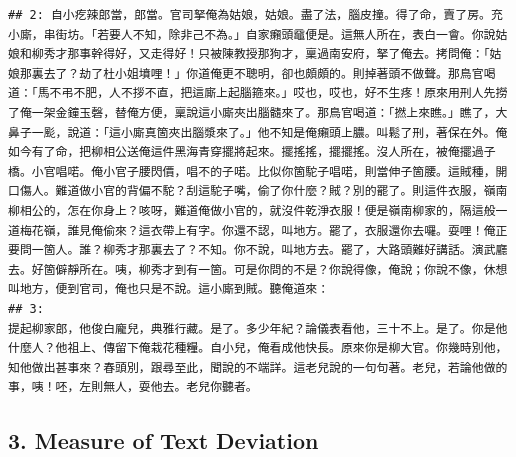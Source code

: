 \documentclass[]{article}
\begin{document}
\begin{verbatim}
## 2: 自小疙辣郎當，郎當。官司拏俺為姑娘，姑娘。盡了法，腦皮撞。得了命，賣了房。充小廝，串街坊。「若要人不知，除非己不為。」自家癩頭黿便是。這無人所在，表白一會。你說姑娘和柳秀才那事幹得好，又走得好！只被陳教授那狗才，稟過南安府，拏了俺去。拷問俺：「姑娘那裏去了？劫了杜小姐墳哩！」你道俺更不聰明，卻也頗頗的。則掉著頭不做聲。那鳥官喝道：「馬不弔不肥，人不拶不直，把這廝上起腦箍來。」哎也，哎也，好不生疼！原來用刑人先撈了俺一架金鐘玉磬，替俺方便，稟說這小廝夾出腦髓來了。那鳥官喝道：「撚上來瞧。」瞧了，大鼻子一颩，說道：「這小廝真箇夾出腦漿來了。」他不知是俺癩頭上膿。叫鬆了刑，著保在外。俺如今有了命，把柳相公送俺這件黑海青穿擺將起來。擺搖搖，擺擺搖。沒人所在，被俺擺過子橋。小官唱喏。俺小官子腰閃價，唱不的子喏。比似你箇駝子唱喏，則當伸子箇腰。這賊種，開口傷人。難道做小官的背偏不駝？刮這駝子嘴，偷了你什麼？賊？別的罷了。則這件衣服，嶺南柳相公的，怎在你身上？咳呀，難道俺做小官的，就沒件乾淨衣服！便是嶺南柳家的，隔這般一道梅花嶺，誰見俺偷來？這衣帶上有字。你還不認，叫地方。罷了，衣服還你去囉。耍哩！俺正要問一箇人。誰？柳秀才那裏去了？不知。你不說，叫地方去。罷了，大路頭難好講話。演武廳去。好箇僻靜所在。咦，柳秀才到有一箇。可是你問的不是？你說得像，俺說；你說不像，休想叫地方，便到官司，俺也只是不說。這小廝到賊。聽俺道來：
## 3:                                                                                                                                                                                                                                                                                                                                                                                                                                                                                                                                                                                                                                                                                                                                                                                                                                                                                                                                                                     提起柳家郎，他俊白龐兒，典雅行藏。是了。多少年紀？論儀表看他，三十不上。是了。你是他什麼人？他祖上、傳留下俺栽花種糧。自小兒，俺看成他快長。原來你是柳大官。你幾時別他，知他做出甚事來？春頭別，跟尋至此，聞說的不端詳。這老兒說的一句句著。老兒，若論他做的事，咦！呸，左則無人，耍他去。老兒你聽者。
\end{verbatim}

\hypertarget{measure-of-text-deviation}{%
\subsection{3. Measure of Text
Deviation}\label{measure-of-text-deviation}}
\end{document}
